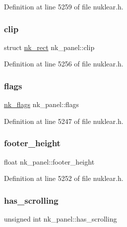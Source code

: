 Definition at line 5259 of file nuklear.\+h.

\mbox{\label{structnk__panel_a6312d12ff73c92d1514429bb16cd43d2}} 
\subsubsection{\texorpdfstring{clip}{clip}}
{\footnotesize\ttfamily struct \mbox{\hyperlink{structnk__rect}{nk\+\_\+rect}} nk\+\_\+panel\+::clip}



Definition at line 5256 of file nuklear.\+h.

\mbox{\label{structnk__panel_a611bb738010ced8097aad851ea4397f0}} 
\subsubsection{\texorpdfstring{flags}{flags}}
{\footnotesize\ttfamily \mbox{\hyperlink{nuklear_8h_a19e0e2f6db4862891d9801de3c3da323}{nk\+\_\+flags}} nk\+\_\+panel\+::flags}



Definition at line 5247 of file nuklear.\+h.

\mbox{\label{structnk__panel_ac206a493d6ac30679e44abc7bfc84db5}} 
\subsubsection{\texorpdfstring{footer\+\_\+height}{footer\_height}}
{\footnotesize\ttfamily float nk\+\_\+panel\+::footer\+\_\+height}



Definition at line 5252 of file nuklear.\+h.

\mbox{\label{structnk__panel_ab2de8d754a7f2cc3f8aea0aa0cd838e9}} 
\subsubsection{\texorpdfstring{has\+\_\+scrolling}{has\_scrolling}}
{\footnotesize\ttfamily unsigned int nk\+\_\+panel\+::has\+\_\+scrolling}



